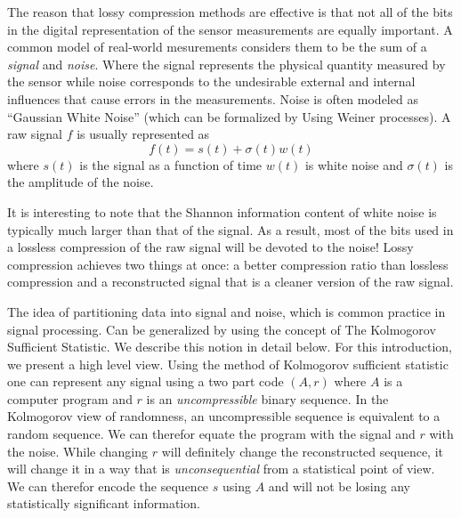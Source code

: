 \documentclass[11pt]{article}
\begin{document}
The reason that lossy compression methods are effective is that not
all of the bits in the digital representation of the sensor
measurements are equally important. A common model of real-world
mesurements considers them to be the sum of a {\em signal} and {\em
  noise}. Where the signal represents the physical quantity measured
by the sensor while noise corresponds to the undesirable external 
and internal influences that cause errors in the
measurements. Noise is often modeled as ``Gaussian White Noise''
(which can be formalized by Using Weiner processes). A raw signal $f$
is usually represented as
\[
f(t) = s(t)+\sigma(t) w(t)
\]
where $s(t)$ is the signal as a function of time $w(t)$ is white
noise and $\sigma(t)$ is the amplitude of the noise.

It is interesting to note that the Shannon information content of
white noise is typically much larger than that of the signal. As a
result, most of the bits used in a lossless compression of the raw
signal will be devoted to the noise! Lossy compression achieves two
things at once: a better compression ratio than lossless compression
and a reconstructed signal that is a cleaner version of the raw
signal.

The idea of partitioning data into signal and noise, which is common
practice in signal processing. Can be generalized by using the concept
of The Kolmogorov Sufficient Statistic. We describe this notion in
detail below. For this introduction, we present a high level
view. Using the method of Kolmogorov sufficient statistic one can
represent any signal using a two part code $(A,r)$ where $A$ is a
computer program and $r$ is an {\em uncompressible} binary
sequence. In the Kolmogorov view of randomness, an uncompressible
sequence is equivalent to a random sequence. We can therefor equate
the program with the signal and $r$ with the noise. While changing $r$
will definitely change the reconstructed sequence, it will change it
in a way that is {\em unconsequential} from a statistical point of
view. We can therefor encode the sequence $s$ using $A$ and will not
be losing any statistically significant information.
 
\iffalse
For now we give an intuitive description. The better
known concept of Kolomogorov complexity quantifies the complexity of a
binary sequence by the length of the shortest program that generates
this sequence.  To define the Kolmogorov Sufficient Statistic we
consider encodings that consist of two parts: a program and an
index. The program is one which can generate any sequence $s$ in a set $S$
of sequence. The index points to a particular sequence in the set. As
the size of the set $S$ is $|S|$, the index requires $\log_2(|S|)$
bits. The algorithm recieves as input the index and it outputs $s$.
We define the 
\fi
\end{document}
